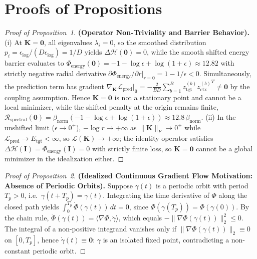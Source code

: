 \section{Proofs of Propositions}
\label{sup:proofs}

\begin{proof}[Proof of Proposition~1]
\textbf{(Operator Non-Triviality and Barrier Behavior).}
(i) At $\mathbf{K} = \mathbf{0}$, all eigenvalues $\lambda_i = 0$, so the smoothed distribution $p_i = \epsilon_{\log}/(D\epsilon_{\log}) = 1/D$ yields $\Delta\mathcal{H}(\mathbf{0}) = 0$, while the smooth shifted energy barrier evaluates to $\Phi_{\text{energy}}(\mathbf{0}) = -1 - \log\epsilon + \log(1 + \epsilon) \approx 12.82$ with strictly negative radial derivative $\partial\Phi_{\text{energy}}/\partial r\big|_{r=0} = 1 - 1/\epsilon < 0$. Simultaneously, the prediction term has gradient $\nabla_{\mathbf{K}}\mathcal{L}_{\text{pred}}\big|_{\mathbf{0}} = -\frac{2}{BD}\sum_{b=1}^B z_{\text{tgt}}^{(b)} {z_{\text{ctx}}^{(b)}}^T \neq \mathbf{0}$ by the coupling assumption. Hence $\mathbf{K} = \mathbf{0}$ is not a stationary point and cannot be a local minimizer, while the shifted penalty at the origin remains finite, $\mathcal{R}_{\text{spectral}}(\mathbf{0}) = \beta_{\text{norm}}(-1 - \log\epsilon + \log(1+\epsilon)) \approx 12.8\,\beta_{\text{norm}}$. (ii) In the unshifted limit ($\epsilon \to 0^+$), $-\log r \to +\infty$ as $\|\mathbf{K}\|_F \to 0^+$ while $\mathcal{L}_{\text{pred}} \to E_{\text{tgt}} < \infty$, so $\mathcal{L}(\mathbf{K}) \to +\infty$; the identity operator satisfies $\Delta\mathcal{H}(\mathbf{I}) = \Phi_{\text{energy}}(\mathbf{I}) = 0$ with strictly finite loss, so $\mathbf{K} = \mathbf{0}$ cannot be a global minimizer in the idealization either.
\end{proof}

\begin{proof}[Proof of Proposition~2]
\textbf{(Idealized Continuous Gradient Flow Motivation: Absence of Periodic Orbits).}
Suppose $\gamma(t)$ is a periodic orbit with period $T_p > 0$, i.e.\ $\gamma(t + T_p) = \gamma(t)$. Integrating the time derivative of $\Phi$ along the closed path yields $\int_0^{T_p} \dot\Phi(\gamma(t))\, dt = 0$, since $\Phi(\gamma(T_p)) = \Phi(\gamma(0))$. By the chain rule, $\dot\Phi(\gamma(t)) = \langle \nabla\Phi, \dot{\gamma} \rangle$, which equals $-\|\nabla\Phi(\gamma(t))\|_2^2 \le 0$. The integral of a non-positive integrand vanishes only if $\|\nabla\Phi(\gamma(t))\|_2 \equiv 0$ on $[0, T_p]$, hence $\dot{\gamma}(t) \equiv \mathbf{0}$: $\gamma$ is an isolated fixed point, contradicting a non-constant periodic orbit.
\end{proof}
